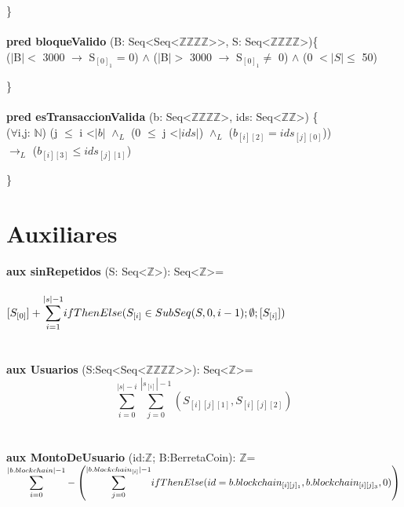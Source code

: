 \documentclass{article}
\newcommand{\Entero}{$\mathds{Z}$}
\newcommand{\Natural}{$\mathds{N}$}
\newcommand{\tuplaDeDosEnteros}{Seq\textless\Entero\texttimes\Entero\textgreater}
\newcommand{\tuplaDeCuatroEnteros}{Seq\textless\Entero\texttimes\Entero\texttimes\Entero\texttimes\Entero\textgreater}
\newcommand{\tuplaDeTuplaDeCuatroEnteros}{{Seq\textless Seq\textless\Entero\texttimes\Entero\texttimes\Entero\texttimes\Entero\textgreater\textgreater}}
\begin{document}
    \}\\\\

    \textbf{pred bloqueValido} (B: \tuplaDeTuplaDeCuatroEnteros, S: \tuplaDeCuatroEnteros)\{\\
        \indent\indent ($|$B$|<$ 3000 $\rightarrow$ S$_{[0]_{1}}$ = 0) $\land$ ($|$B$|>$ 3000 $\rightarrow$ S$_{[0]_{1}} \neq$ 0) $\land$ (0 $<|S| \le$ 50)

    \}\\\\

    \textbf{pred esTransaccionValida} (b: \tuplaDeCuatroEnteros, 
                                        ids: \tuplaDeDosEnteros) \{\\
        \indent\indent($\forall$i,j: \Natural) (j $\leq$ i \textless $|b|$ $\land_L$ (0 $\leq$ j \textless $|ids|$) $\land_L$ ($b_{[i][2]} = ids_{[j][0]}$))\\
        \indent\indent\indent\indent\indent $\rightarrow_L$ ($b_{[i][3]} \leq ids_{[j][1]}$)

    \}
\newpage
\section{Auxiliares}

    \textbf{aux sinRepetidos} (S: Seq\textless$\mathds{Z}$\textgreater): Seq\textless$\mathds{Z}$\textgreater =\\\\
        \indent\indent $[S_{[0]}] + \mathlarger\sum\limits_{i=1}^{|s|-1} ifThenElse(S_{[i]} \in SubSeq(S, 0, i-1); \emptyset; [S_{[i]}])$ \\\\\\

    \textbf{aux Usuarios} (S:\tuplaDeTuplaDeCuatroEnteros): Seq\textless$\mathds{Z}$\textgreater=
    \[
    \sum\limits_{i=0}^{|s|-i} \sum\limits_{j=0}^{|s_{[i]}|-1} \left(S_{[i][j][1]}, S_{[i][j][2]}\right)
    \]\\\\

    \textbf{aux MontoDeUsuario} (id:\Entero; B:BerretaCoin): \Entero=\\

        \indent\indent
        $\mathlarger\sum\limits_{i=0}^{|b.blockchain| - 1} - \left(
        \mathlarger\sum\limits_{j=0}^{|b.blockchain_{[i]}|-1} ifThenElse (id = b.blockchain_{[i][j]_1}, b.blockchain_{[i][j]_3}, 0)\right)$\\
\end{document}
